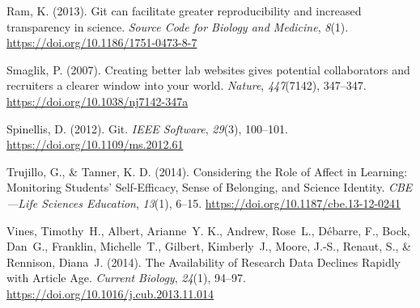 \begin{CSLReferences}{1}{0}
\leavevmode{}%
Ram, K. (2013). Git can facilitate greater reproducibility and increased transparency in science. \emph{Source Code for Biology and Medicine}, \emph{8}(1). \url{https://doi.org/10.1186/1751-0473-8-7}

\leavevmode{}%
Smaglik, P. (2007). Creating better lab websites gives potential collaborators and recruiters a clearer window into your world. \emph{Nature}, \emph{447}(7142), 347--347. \url{https://doi.org/10.1038/nj7142-347a}

\leavevmode{}%
Spinellis, D. (2012). Git. \emph{IEEE Software}, \emph{29}(3), 100--101. \url{https://doi.org/10.1109/ms.2012.61}

\leavevmode{}%
Trujillo, G., \& Tanner, K. D. (2014). Considering the Role of Affect in Learning: Monitoring Students' Self-Efficacy, Sense of Belonging, and Science Identity. \emph{CBE---Life Sciences Education}, \emph{13}(1), 6--15. \url{https://doi.org/10.1187/cbe.13-12-0241}

\leavevmode{}%
Vines, Timothy~H., Albert, Arianne~Y. K., Andrew, Rose~L., Débarre, F., Bock, Dan~G., Franklin, Michelle~T., Gilbert, Kimberly~J., Moore, J.-S., Renaut, S., \& Rennison, Diana~J. (2014). The Availability of Research Data Declines Rapidly with Article Age. \emph{Current Biology}, \emph{24}(1), 94--97. \url{https://doi.org/10.1016/j.cub.2013.11.014}

\end{CSLReferences}

